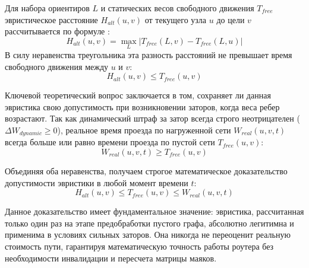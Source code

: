 Для набора ориентиров $L$ и статических весов свободного движения $T_{free}$ эвристическое расстояние $H_{alt}(u, v)$ от текущего узла $u$ до цели $v$ рассчитывается по формуле \cite{goldberg2004alt}:
\begin{equation}
    H_{alt}(u, v) = \max_{L} |T_{free}(L, v) - T_{free}(L, u)|
\end{equation}
В силу неравенства треугольника эта разность расстояний не превышает время свободного движения между $u$ и $v$:
\begin{equation}
    H_{alt}(u, v) \le T_{free}(u, v)
\end{equation}

Ключевой теоретический вопрос заключается в том, сохраняет ли данная эвристика свою допустимость при возникновении заторов, когда веса ребер возрастают.
Так как динамический штраф за затор всегда строго неотрицателен ($\Delta W_{dynamic} \ge 0$), реальное время проезда по нагруженной сети $W_{real}(u, v, t)$ всегда больше или равно времени проезда по пустой сети $T_{free}(u, v)$: 
\begin{equation}
    W_{real}(u, v, t) \ge T_{free}(u, v)
\end{equation}

Объединяя оба неравенства, получаем строгое математическое доказательство допустимости эвристики в любой момент времени $t$:
\begin{equation}
    H_{alt}(u, v) \le T_{free}(u, v) \le W_{real}(u, v, t)
\end{equation}

Данное доказательство имеет фундаментальное значение: эвристика, рассчитанная только один раз на этапе предобработки пустого графа, абсолютно легитимна и применима в условиях сильных заторов. Она никогда не переоценит реальную стоимость пути, гарантируя математическую точность работы роутера без необходимости инвалидации и пересчета матрицы маяков.

